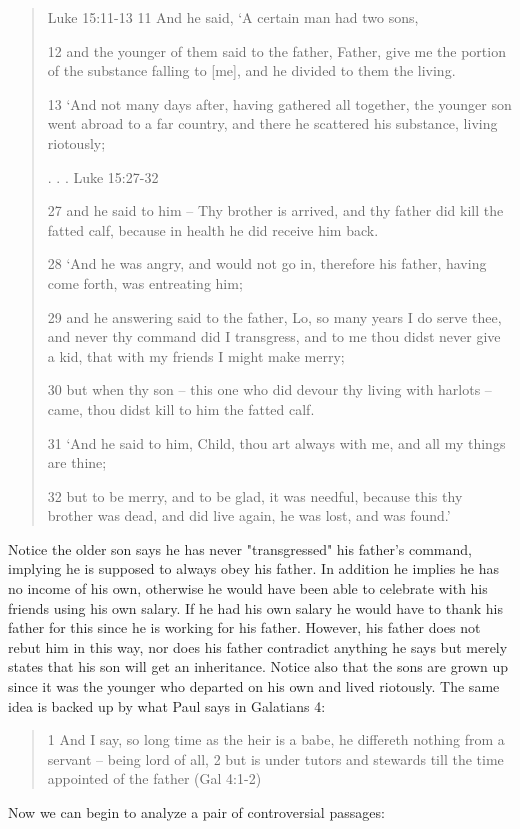 \documentclass[11pt]{article}
\begin{document}
\begin{quote}
Luke 15:11-13
11 And he said, `A certain man had two sons,

12 and the younger of them said to the father, Father, give me the portion of the substance falling to [me], and he divided to them the living.

13 `And not many days after, having gathered all together, the younger son went abroad to a far country, and there he scattered his substance, living riotously;

. . . 
Luke 15:27-32

27 and he said to him -- Thy brother is arrived, and thy father did kill the fatted calf, because in health he did receive him back.

28 `And he was angry, and would not go in, therefore his father, having come forth, was entreating him;

29 and he answering said to the father, Lo, so many years I do serve thee, and never thy command did I transgress, and to me thou didst never give a kid, that with my friends I might make merry;

30 but when thy son -- this one who did devour thy living with harlots -- came, thou didst kill to him the fatted calf.

31 `And he said to him, Child, thou art always with me, and all my things are thine;

32 but to be merry, and to be glad, it was needful, because this thy brother was dead, and did live again, he was lost, and was found.' 
\end{quote}

Notice the older son says he has never "transgressed" his father's command, implying he is supposed to always obey his father. In addition he implies he has no income of his own, otherwise he would have been able to celebrate with his friends using his own salary. If he had his own salary he would have to thank his father for this since he is working for his father. However, his father does not rebut him in this way, nor does his father contradict anything he says but merely states that his son will get an inheritance. Notice also that the sons are grown up since it was the younger who departed on his own and lived riotously. The same idea is backed up by what Paul says in Galatians 4:
\begin{quote}
1 And I say, so long time as the heir is a babe, he differeth nothing from a servant -- being lord of all,
2 but is under tutors and stewards till the time appointed of the father
(Gal 4:1-2)
\end{quote}
Now we can begin to analyze a pair of controversial passages:
\end{document}
